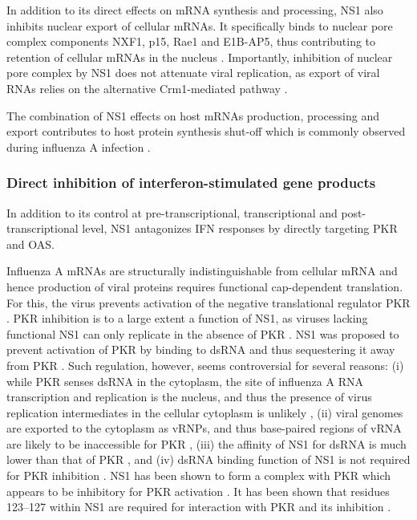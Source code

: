 		In addition to its direct effects on mRNA synthesis and processing, NS1 also inhibits nuclear export of cellular mRNAs. It specifically binds to nuclear pore complex components NXF1, p15, Rae1 and E1B-AP5, thus contributing to retention of cellular mRNAs in the nucleus \parencite{Satterly2007}. Importantly, inhibition of nuclear pore complex by NS1 does not attenuate viral replication, as export of viral RNAs relies on the alternative Crm1-mediated pathway \parencite{Neumann2000}.
		
		The combination of NS1 effects on host mRNAs production, processing and export contributes to host protein synthesis shut-off which is commonly observed during influenza A infection \parencite{Beloso1992}.
		
		\subsubsection{Direct inhibition of interferon-stimulated gene products} \label{sec:direct_inhibition}
		
		In addition to its control at pre-transcriptional, transcriptional and post-transcriptional level, NS1 antagonizes \gls{IFN} responses by directly targeting \gls{PKR} and \gls{OAS}. 
		
		Influenza A mRNAs are structurally indistinguishable from cellular mRNA and hence production of viral proteins requires functional cap-dependent translation. For this, the virus prevents activation of the negative translational regulator \gls{PKR}  \parencite{Katze1986, Katze1988}. \gls{PKR} inhibition is to a large extent a function of \gls{NS1}, as viruses lacking functional \gls{NS1} can only replicate in the absence of \gls{PKR} \parencite{Bergmann2000a}. \gls{NS1} was proposed to prevent activation of \gls{PKR} by binding to dsRNA and thus sequestering it away from \gls{PKR} \parencite{Lu1995}. Such regulation, however, seems controversial for several reasons: (i) while \gls{PKR} senses dsRNA in the cytoplasm, the site of influenza A RNA transcription and replication is the nucleus, and thus the presence of virus replication intermediates in the cellular cytoplasm is unlikely \parencite{Jackson1982}, (ii) viral genomes are exported to the cytoplasm as \gls{vRNP}s, and thus base-paired regions of \gls{vRNA} are likely to be inaccessible for \gls{PKR} \parencite{Coloma2009}, (iii) the affinity of \gls{NS1} for dsRNA is much lower than that of \gls{PKR} \parencite{Chien2004, Husain2012}, and (iv) dsRNA binding function of \gls{NS1} is not required for \gls{PKR} inhibition \parencite{Li2006}. \gls{NS1} has been shown to form a complex with \gls{PKR} which appears to be inhibitory for \gls{PKR} activation \parencite{Tan1998, Li2006}. It has been shown that residues 123--127 within \gls{NS1} are required for interaction with \gls{PKR} and its inhibition \parencite{Min2007}.	
				
